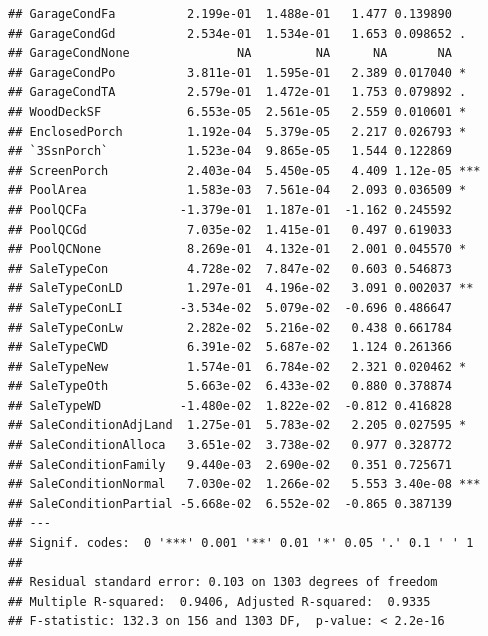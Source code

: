 \documentclass[american,]{article}
\theoremstyle{definition}
\theoremstyle{definition}
\theoremstyle{definition}
\theoremstyle{remark}
\begin{document}
\begin{verbatim}
## GarageCondFa          2.199e-01  1.488e-01   1.477 0.139890    
## GarageCondGd          2.534e-01  1.534e-01   1.653 0.098652 .  
## GarageCondNone               NA         NA      NA       NA    
## GarageCondPo          3.811e-01  1.595e-01   2.389 0.017040 *  
## GarageCondTA          2.579e-01  1.472e-01   1.753 0.079892 .  
## WoodDeckSF            6.553e-05  2.561e-05   2.559 0.010601 *  
## EnclosedPorch         1.192e-04  5.379e-05   2.217 0.026793 *  
## `3SsnPorch`           1.523e-04  9.865e-05   1.544 0.122869    
## ScreenPorch           2.403e-04  5.450e-05   4.409 1.12e-05 ***
## PoolArea              1.583e-03  7.561e-04   2.093 0.036509 *  
## PoolQCFa             -1.379e-01  1.187e-01  -1.162 0.245592    
## PoolQCGd              7.035e-02  1.415e-01   0.497 0.619033    
## PoolQCNone            8.269e-01  4.132e-01   2.001 0.045570 *  
## SaleTypeCon           4.728e-02  7.847e-02   0.603 0.546873    
## SaleTypeConLD         1.297e-01  4.196e-02   3.091 0.002037 ** 
## SaleTypeConLI        -3.534e-02  5.079e-02  -0.696 0.486647    
## SaleTypeConLw         2.282e-02  5.216e-02   0.438 0.661784    
## SaleTypeCWD           6.391e-02  5.687e-02   1.124 0.261366    
## SaleTypeNew           1.574e-01  6.784e-02   2.321 0.020462 *  
## SaleTypeOth           5.663e-02  6.433e-02   0.880 0.378874    
## SaleTypeWD           -1.480e-02  1.822e-02  -0.812 0.416828    
## SaleConditionAdjLand  1.275e-01  5.783e-02   2.205 0.027595 *  
## SaleConditionAlloca   3.651e-02  3.738e-02   0.977 0.328772    
## SaleConditionFamily   9.440e-03  2.690e-02   0.351 0.725671    
## SaleConditionNormal   7.030e-02  1.266e-02   5.553 3.40e-08 ***
## SaleConditionPartial -5.668e-02  6.552e-02  -0.865 0.387139    
## ---
## Signif. codes:  0 '***' 0.001 '**' 0.01 '*' 0.05 '.' 0.1 ' ' 1
## 
## Residual standard error: 0.103 on 1303 degrees of freedom
## Multiple R-squared:  0.9406, Adjusted R-squared:  0.9335 
## F-statistic: 132.3 on 156 and 1303 DF,  p-value: < 2.2e-16
\end{verbatim}
\end{document}
